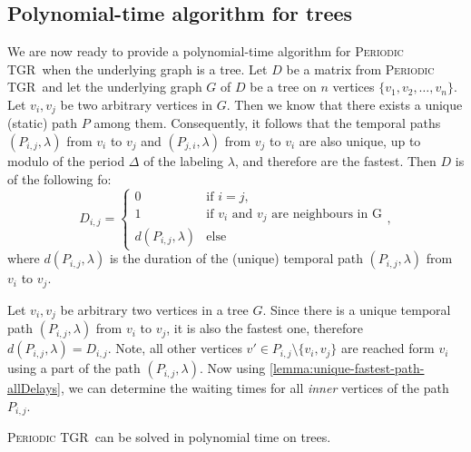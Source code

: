\documentclass[a4paper,UKenglish,cleveref, autoref, thm-restate]{lipics-v2021}
\newcommand{\deltaExact}{\textsc{Periodic TGR}}
\begin{document}
\subsection{Polynomial-time algorithm for trees}\label{sec:treealgo}
We are now ready to provide a polynomial-time algorithm for \deltaExact\ when the underlying graph is a tree.
Let $D$ be a matrix from \deltaExact\ and let the underlying graph $G$ of $D$ be a tree on $n$ vertices $\{v_1, v_2, \dots, v_n\}$.
Let $v_i,v_j$ be two arbitrary vertices in $G$. Then we know that there exists a unique (static) path $P$ among them.
Consequently, it follows that the temporal paths $(P_{i,j},\lambda)$ from $v_i$ to $v_j$ and $(P_{j,i},\lambda)$ from $v_j$ to $v_i$ are also unique, up to modulo of the period $\Delta$ of the labeling $\lambda$,
and therefore are the fastest.
Then $D$ is of the following fo\rm:
\begin{equation*}
    D_{i,j} =
    \begin{cases}
    0 & \text{if $i = j$}, \\
    1 & \text{if $v_i$ and $v_j$ are neighbours in G}\\
    d(P_{i,j},\lambda) & \text{else}
    \end{cases},
\end{equation*}
where $d(P_{i,j},\lambda)$ is the duration of the (unique) temporal path $(P_{i,j},\lambda)$ from $v_i$ to $v_j$.

\begin{observation}\label{obs:travel-delays-in-trees}
    Let $v_i,v_j$  be arbitrary two vertices in a tree $G$. 
    Since there is a unique temporal path $(P_{i,j},\lambda)$ from $v_i$ to $v_j$, it is also the fastest one, therefore $d(P_{i,j},\lambda) = D_{i,j}$. 
    Note, all other vertices $v' \in P_{i,j} \setminus \{v_i,v_j\}$ are reached form $v_i$ using a part of the path $(P_{i,j},\lambda)$.
    Now using \cref{lemma:unique-fastest-path-allDelays}, we can determine the waiting times for all \emph{inner} vertices of the path $P_{i,j}$.
\end{observation}

\begin{theorem} \label{thm:deltaExact-PolyTimeTrees}
    \deltaExact\ can be solved in polynomial time on trees.
\end{theorem}
\end{document}
